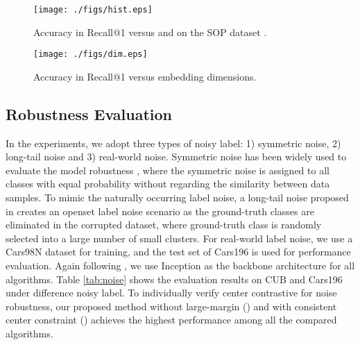 \documentclass[10pt,twocolumn,letterpaper]{article}
\begin{document}
\begin{figure}[t]
\centering
\texttt{[image: ./figs/hist.eps]}  
\caption{Accuracy in Recall@1 versus  and  on the SOP dataset \cite{liftstruct}.}  
\label{fig:hist}
\end{figure}
\begin{figure}[t]
\centering
\texttt{[image: ./figs/dim.eps]}  
\caption{Accuracy in Recall@1 versus embedding dimensions.}  
\label{fig:dim}
\end{figure}

\subsection{Robustness Evaluation}
In the experiments, we adopt three types of noisy label: 1) symmetric noise, 2) long-tail noise and 3) real-world noise. Symmetric noise has been widely used to evaluate the model robustness \cite{coteaching,coteaching_plus}, where the symmetric noise is assigned to all classes with equal probability without regarding the similarity between data samples. To mimic the naturally occurring label noise, a long-tail noise proposed in \cite{prism} creates an openset label noise scenario as the ground-truth classes are eliminated in the corrupted dataset, where ground-truth class is randomly selected into a large number of small clusters. For real-world label noise, we use a Cars98N dataset \cite{prism} for training, and the test set of Cars196 is used for performance evaluation. 
Again following \cite{prism}, we use Inception \cite{inception} as the backbone architecture for all algorithms. Table \ref{tab:noise} shows the evaluation results on CUB and Cars196 under difference noisy label. To individually verify center contrastive for  noise robustness, our proposed method without large-margin () and with consistent center constraint () achieves the highest performance among all the compared algorithms.
\end{document}
